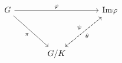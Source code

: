 \documentclass[a4paper, 12pt]{article}
\begin{document}
    \[
        \begin{tikzcd}[column sep = large, row sep = huge] %
            G \arrow{rr}{\varphi} \arrow[swap]{dr}{\pi} & & \mathrm{Im\varphi} \arrow[dashrightarrow, swap]{dl}{\psi}
            \\ %
            & G / K \arrow[dashrightarrow, swap]{ur}{\theta} & %
        \end{tikzcd}
    \]
\end{document}
